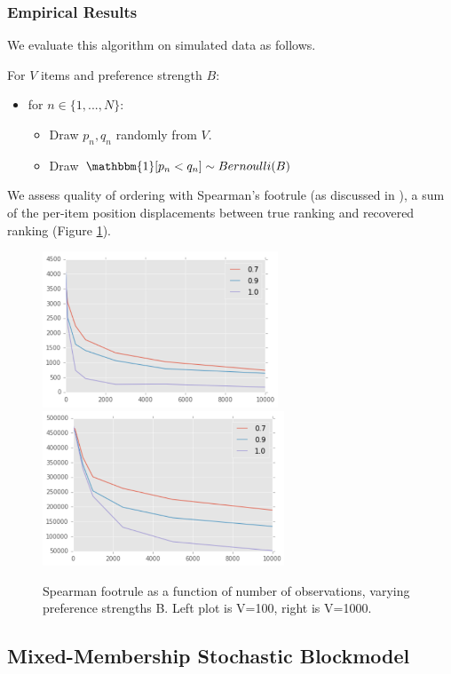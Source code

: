 \subsubsection{Empirical Results}

We evaluate this algorithm on simulated data as follows.

For $V$ items and preference strength $B$:

\begin{itemize}
	\item for $n \in \{1, ..., N\}$:
	\begin{itemize}
		\item Draw $p_n, q_n$ randomly from $V$.
		\item Draw $\mathbbm{1}[p_n < q_n] \sim Bernoulli(B)$
	\end{itemize}
\end{itemize}

We assess quality of ordering with Spearman's footrule (as discussed in \cite{jordan}), a sum of the per-item position displacements between true ranking and recovered ranking (Figure \ref{fig:pr_0}).

\begin{figure}[!htb]
\includegraphics[width=	7cm]{images/pr_100}
\hfill
\includegraphics[width=7.2cm]{images/pr_1000}
\caption{Spearman footrule as a function of number of observations, varying preference strengths B. Left plot is V=100, right is V=1000.}
\label{fig:pr_0} 
\end{figure}

\subsection{Mixed-Membership Stochastic Blockmodel}

